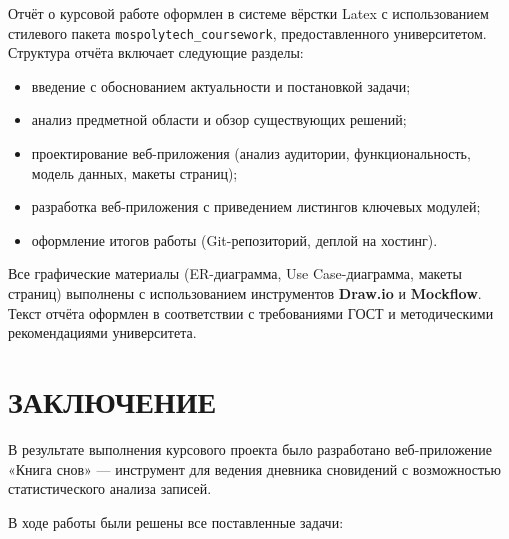 \documentclass[14pt, a4paper]{extarticle}
\begin{document}
Отчёт о курсовой работе оформлен в системе вёрстки Latex с использованием стилевого пакета \texttt{mospolytech\_coursework}, предоставленного университетом. Структура отчёта включает следующие разделы:

\begin{itemize}
    \item введение с обоснованием актуальности и постановкой задачи;
    \item анализ предметной области и обзор существующих решений;
    \item проектирование веб-приложения (анализ аудитории, функциональность, модель данных, макеты страниц);
    \item разработка веб-приложения с приведением листингов ключевых модулей;
    \item оформление итогов работы (Git-репозиторий, деплой на хостинг).
\end{itemize}

Все графические материалы (ER-диаграмма, Use Case-диаграмма, макеты страниц) выполнены с использованием инструментов \textbf{Draw.io} и \textbf{Mockflow}. Текст отчёта оформлен в соответствии с требованиями ГОСТ и методическими рекомендациями университета.

\newpage


\section*{ЗАКЛЮЧЕНИЕ}

В результате выполнения курсового проекта было разработано веб-приложение «Книга снов» — инструмент для ведения дневника сновидений с возможностью статистического анализа записей.

В ходе работы были решены все поставленные задачи:
\end{document}
